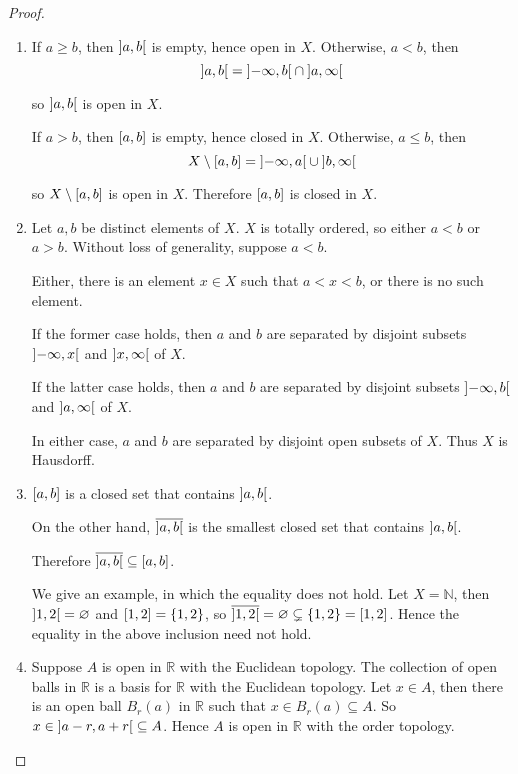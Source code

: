 \begin{proof}
	\begin{enumerate}[label={(\alph*)}]
		\item If $a\geq b$, then $\left]{a,b}\right[$ is empty, hence open in $X$. Otherwise, $a < b$, then
		      \[
			      \left]{a, b}\right[ = \left]{-\infty, b}\right[ \cap \left]{a, \infty}\right[
		      \]

		      so $\left]{a, b}\right[$ is open in $X$.

		      If $a > b$, then $\left[{a,b}\right]$ is empty, hence closed in $X$. Otherwise, $a\leq b$, then
		      \[
			      X\setminus \left[{a, b}\right] = \left]{-\infty, a}\right[\cup\left]{b,\infty}\right[
		      \]

		      so $X\setminus \left[{a,b}\right]$ is open in $X$. Therefore $\left[{a,b}\right]$ is closed in $X$.
		\item Let $a, b$ be distinct elements of $X$. $X$ is totally ordered, so either $a < b$ or $a > b$. Without loss of generality, suppose $a < b$.

		      Either, there is an element $x\in X$ such that $a < x < b$, or there is no such element.

		      If the former case holds, then $a$ and $b$ are separated by disjoint subsets $\left]{-\infty, x}\right[$ and $\left]{x, \infty}\right[$ of $X$.

		      If the latter case holds, then $a$ and $b$ are separated by disjoint subsets $\left]{-\infty, b}\right[$ and $\left]{a, \infty}\right[$ of $X$.

		      In either case, $a$ and $b$ are separated by disjoint open subsets of $X$. Thus $X$ is Hausdorff.
		\item $\left[{a,b}\right]$ is a closed set that contains $\left]{a, b}\right[$.

		      On the other hand, $\overline{\left]{a,b}\right[}$ is the smallest closed set that contains $\left]{a, b}\right[$.

		      Therefore $\overline{\left]{a,b}\right[}\subseteq \left[{a, b}\right]$.

		      We give an example, in which the equality does not hold. Let $X = \mathbb{N}$, then $\left]{1,2}\right[ = \varnothing$ and $\left[{1,2}\right] = \{ 1, 2 \}$, so $\overline{\left]{1,2}\right[} = \varnothing \subsetneq \{ 1, 2 \} = \left[{1,2}\right]$. Hence the equality in the above inclusion need not hold.
		\item Suppose $A$ is open in $\mathbb{R}$ with the Euclidean topology. The collection of open balls in $\mathbb{R}$ is a basis for $\mathbb{R}$ with the Euclidean topology. Let $x\in A$, then there is an open ball $B_{r}(a)$ in $\mathbb{R}$ such that $x\in B_{r}(a)\subseteq A$. So $x\in \left]{a-r,a+r}\right[\subseteq A$. Hence $A$ is open in $\mathbb{R}$ with the order topology.


\end{enumerate}
\end{proof}
